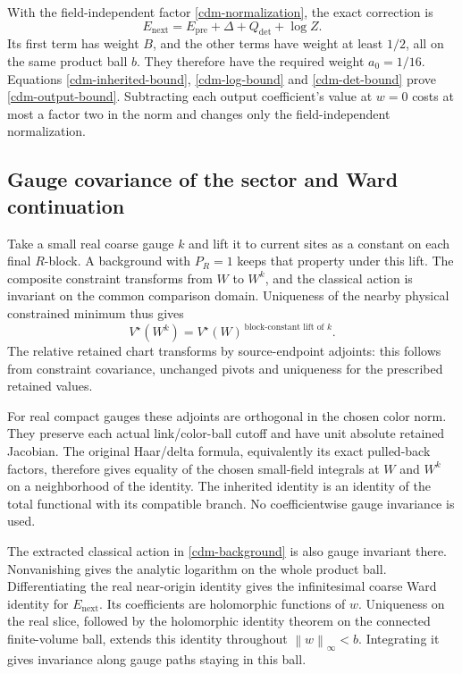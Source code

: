 \documentclass[11pt]{article}
\theoremstyle{remark}
\newcommand{\norm}[1]{\left\|#1\right\|}
\begin{document}
With the field-independent factor
\eqref{cdm-normalization}, the exact correction is
\begin{equation}
 E_{\mathrm{next}}=
 E_{\mathrm{pre}}+\Delta+Q_{\det}+\log Z.
 \label{cdm-update}
\end{equation}
Its first term has weight $B$, and the other terms have
weight at least $1/2$, all on the same product ball $b$.
They therefore have the required weight $a_0=1/16$.
Equations \eqref{cdm-inherited-bound},
\eqref{cdm-log-bound} and \eqref{cdm-det-bound} prove
\eqref{cdm-output-bound}. Subtracting each output
coefficient's value at $w=0$ costs at most a factor two
in the norm and changes only the field-independent
normalization.

\subsection{Gauge covariance of the sector and Ward continuation}
\label{cdm-gauge-section}

Take a small real coarse gauge $k$ and lift it to current
sites as a constant on each final $R$-block. A background
with $P_R=1$ keeps that property under this lift. The
composite constraint transforms from $W$ to $W^k$, and
the classical action is invariant on the common
comparison domain. Uniqueness of the nearby physical
constrained minimum thus gives
\begin{equation}
 V^\star(W^k)=
 V^\star(W)^{\,\text{block-constant lift of }k}.
 \label{cdm-background-covariance}
\end{equation}
The relative retained chart transforms by source-endpoint
adjoints: this follows from constraint covariance,
unchanged pivots and uniqueness for the prescribed
retained values.

For real compact gauges these adjoints are orthogonal
in the chosen color norm. They preserve each actual
link/color-ball cutoff and have unit absolute retained
Jacobian. The original Haar/delta formula, equivalently
its exact pulled-back factors, therefore gives equality
of the chosen small-field integrals at $W$ and $W^k$
on a neighborhood of the identity. The inherited
identity is an identity of the total functional with
its compatible branch. No coefficientwise gauge
invariance is used.

The extracted classical action in
\eqref{cdm-background} is also gauge invariant there.
Nonvanishing gives the analytic logarithm on the whole
product ball. Differentiating the real near-origin
identity gives the infinitesimal coarse Ward identity
for $E_{\mathrm{next}}$. Its coefficients are holomorphic
functions of $w$. Uniqueness on the real slice, followed
by the holomorphic identity theorem on the connected
finite-volume ball, extends this identity throughout
$\norm{w}_\infty<b$. Integrating it gives invariance
along gauge paths staying in this ball.
\end{document}
